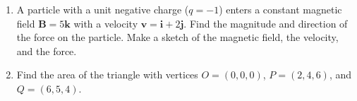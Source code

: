\documentclass[%
]{article}
\newcommand{\vect}[1]{\mathbf{#1}}
\begin{document}
\begin{enumerate}




\item %
A particle with a unit negative charge ($q=-1$) enters a constant magnetic field $\vect B=5\vect k$ with a velocity $\vect v=\vect i+2\vect j$.  Find the magnitude and direction of the force on the particle.  Make a sketch of the magnetic field, the velocity, and the force.



\item %
Find the area of the triangle with vertices $O=(0,0,0)$, $P=(2,4,6)$, and $Q=(6,5,4)$.




\end{enumerate}
\end{document}
